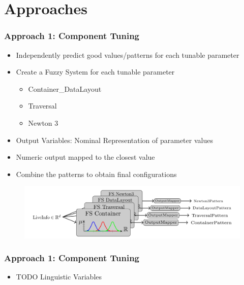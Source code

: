 \documentclass[
	10pt,
	t		%
]{beamer}
\begin{document}
\section{Approaches}
\begin{frame}
	\frametitle{Approach 1: Component Tuning}
	\begin{itemize}
		\item Independently predict good values/patterns for each tunable parameter
		\item Create a Fuzzy System for each tunable parameter
		      \begin{itemize}
			      \item Container\_DataLayout
			      \item Traversal
			      \item Newton 3
		      \end{itemize}
		\item Output Variables: Nominal Representation of parameter values
		\item Numeric output mapped to the closest value {\footnotesize \cite{Mohammed2022}}
		\item Combine the patterns to obtain final configurations
	\end{itemize}

	\begin{figure}
		\centering
		\includegraphics[width=1\textwidth]{figures/component-approach.png}
	\end{figure}

\end{frame}


\begin{frame}
	\frametitle{Approach 1: Component Tuning}
	\begin{itemize}
		\item TODO Linguistic Variables
	\end{itemize}

\end{frame}
\end{document}
